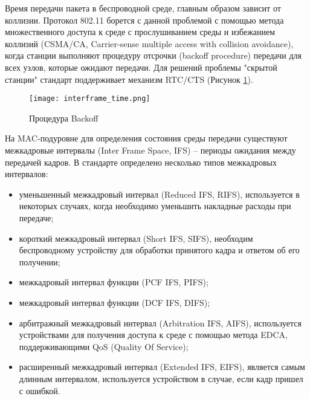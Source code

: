  Время передачи пакета в беспроводной среде, главным образом зависит от коллизии. Протокол 802.11 борется с данной проблемой с помощью метода множественного доступа к среде с прослушиванием среды и избежанием коллизий (CSMA/CA, Carrier-sense multiple access with collision avoidance), когда станции выполняют процедуру отсрочки (backoff procedure) передачи для всех узлов, которые ожидают передачи. Для решений проблемы "скрытой станции" стандарт поддерживает механизм RTC/CTS (Рисунок \cref{fig:part1_interframe_time}).

\begin{figure}[h!]
  \centering
   \texttt{[image: interframe\_time.png]}
\caption{Процедура Backoff}
\label{fig:part1_interframe_time}
\end{figure}

На MAC-подуровне  для определения состояния среды передачи существуют межкадровые интервалы (Inter Frame Space, IFS) -- периоды ожидания между передачей кадров. В стандарте определено несколько типов межкадровых интервалов:

\begin{itemize}
  \item уменьшенный межкадровый интервал (Reduced IFS, RIFS), используется в некоторых случаях, когда необходимо уменьшить накладные расходы при передаче;
  \item короткий межкадровый интервал (Short IFS, SIFS), необходим беспроводному устройству для обработки принятого кадра и ответом об его получении;
  \item межкадровый интервал функции (PCF IFS, PIFS);
  \item межкадровый интервал функции (DCF IFS, DIFS);
  \item арбитражный межкадровый интервал (Arbitration IFS, AIFS), используется устройствами для получения доступа к среде с помощью метода EDCA, поддерживающими QoS (Quality Of Service);
  \item расширенный межкадровый интервал (Extended IFS, EIFS), является самым длинным интервалом, используется устройством в случае, если кадр пришел с ошибкой.
\end{itemize}

